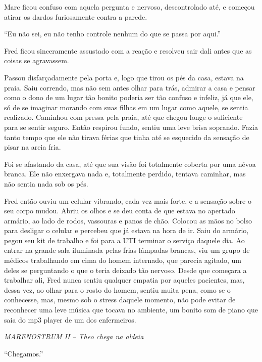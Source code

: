 Marc ficou confuso com aquela pergunta e nervoso, descontrolado até, e
começou atirar os dardos furiosamente contra a parede.

``Eu não sei, eu não tenho controle nenhum do que se passa por aqui.''

Fred ficou sinceramente assustado com a reação e resolveu sair dali
antes que as coisas se agravassem.

Passou disfarçadamente pela porta e, logo que tirou os pés da casa,
estava na praia. Saiu correndo, mas não sem antes olhar para trás,
admirar a casa e pensar como o dono de um lugar tão bonito poderia ser
tão confuso e infeliz, já que ele, só de se imaginar morando com suas
filhas em um lugar como aquele, se sentia realizado. Caminhou com pressa
pela praia, até que chegou longe o suficiente para se sentir seguro.
Então respirou fundo, sentiu uma leve brisa soprando. Fazia tanto tempo
que ele não tirava férias que tinha até se esquecido da sensação de
pisar na areia fria.

Foi se afastando da casa, até que sua visão foi totalmente coberta por
uma névoa branca. Ele não enxergava nada e, totalmente perdido, tentava
caminhar, mas não sentia nada sob os pés.

Fred então ouviu um celular vibrando, cada vez mais forte, e a sensação
sobre o seu corpo mudou. Abriu os olhos e se deu conta de que estava no
apertado armário, ao lado de rodos, vassouras e panos de chão. Colocou
as mãos no bolso para desligar o celular e percebeu que já estava na
hora de ir. Saiu do armário, pegou seu kit de trabalho e foi para a UTI
terminar o serviço daquele dia. Ao entrar na grande sala iluminada pelas
frias lâmpadas brancas, viu um grupo de médicos trabalhando em cima do
homem internado, que parecia agitado, um deles se perguntando o que o
teria deixado tão nervoso. Desde que começara a trabalhar ali, Fred
nunca sentiu qualquer empatia por aqueles pacientes, mas, dessa vez, ao
olhar para o rosto do homem, sentiu muita pena, como se o conhecesse,
mas, mesmo sob o stress daquele momento, não pode evitar de reconhecer
uma leve música que tocava no ambiente, um bonito som de piano que saia
do mp3 player de um dos enfermeiros.

\asterisc

\emph{MARENOSTRUM II -- Theo chega na aldeia}

``Chegamos.''

